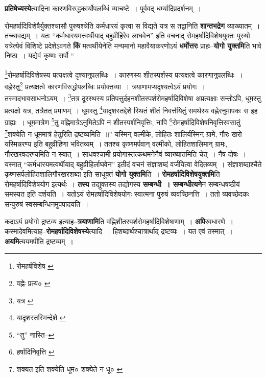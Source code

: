\documentclass[article,12pt,a4paper]{memoir}
\begin{document}
	  \pstart \textbf{प्रतिषेध्यस्ये}त्यादिना कारणविरुद्धकार्योपलब्धिं व्याचष्टे । पूर्ववद् धर्म्यादिप्रदर्शनम् ।
	\pend
      

	  \pstart रोमहर्षादिविशेषैर्युक्तश्चासौ पुरुषश्चेति कर्मधारयं कृत्वा स विद्यते यत्र स तद्वानिति \textbf{शान्तभद्रेण} व्याख्यातम् । तच्चावद्यम् । यतः “कर्मधारयमत्त्वर्थीयाद् बहुव्रीहिरेव लाघवेन” इति वचनाद् रोमहर्षादिविशेषयुक्तः पुरुषो यत्रेत्येवं विशिष्टे प्रदेशेऽवगते \textbf{किं} मत्वर्थीयेनेति मन्यमानो महावैयाकरणोऽयं \textbf{धर्मोत्तरः} प्राहः--\textbf{योगो युक्तमि}ति भावे निष्ठा । यद्येवं कृष्णः सर्पो  \leavevmode{} “
	  
	\footnote{रोमहर्षविशेष \cite{dp-msD} \cite{dp-msB}}\-रोमहर्षादिविशेषस्य प्रत्यक्षत्वे दृश्यानुपलब्धिः । कारणस्य शीतस्पर्शस्य प्रत्यक्षत्वे कारणानुपलब्धिः । वह्नेस्तु\footnote{वह्नेः प्रत्य० \cite{dp-msC} \cite{dp-msD}} प्रत्यक्षत्वे कारणविरुद्धोपलब्धिः प्रयोक्तव्या । त्रयाणामप्यदृश्यत्वेऽयं प्रयोगः । तस्मादभावसाधनोऽयम् । \footnote{यत्र \cite{dp-msA}}\-तत्र दूरस्थस्य प्रतिपत्तुर्दहनशीतस्पर्शरोमहर्षादिविशेषा अप्रत्यक्षाः सन्तोऽपि, धूमस्तु प्रत्यक्षो यत्र, तत्रैतत् प्रमाणम् । धूमस्तु \footnote{यादृशस्तस्मिन्देशे \cite{dp-msA} \cite{dp-msC} \cite{dp-edP} \cite{dp-edH} \cite{dp-edE} \cite{dp-edN}}\-यादृशस्तद्देशे स्थितं शीतं निवर्त्तयितुं समर्थस्य वह्नेरनुमापकः स इह ग्राह्यः । धूममात्रेण \footnote{“तु” नास्ति--\cite{dp-msA}}\-तु वह्निमात्रेऽनुमितेऽपि न शीतस्पर्शनिवृत्तिः, नापि \footnote{हर्षादिनिवृत्ति \cite{dp-msD} \cite{dp-msB}}\-रोमहर्षादिविशेषनिवृत्तिरवसातुं \footnote{शक्यत इति \cite{dp-msC} शक्येति धूम० \cite{dp-msA} शक्येते न धू० \cite{dp-edH}}\-शक्येति न धूममात्रं हेतुरिति द्रष्टव्यमिति ॥” यस्मिन् वल्मीके, लोहितः शालिर्यस्मिन् ग्रामे, गौरः खरो यस्मिन्नरण्य इति बहुव्रीहिणा भवितव्यम् । ततश्च कृष्णमर्पवान् वल्मीको, लोहितशालिमान् ग्रामः, गौरखरवदरण्यमिति न स्यात् । साधवश्चामी प्रयोगास्तत्कथमनेनैवं व्याख्यातमिति चेत् । नैष दोषः । यस्मात् “कर्मधारयमत्वर्थीयाद् बहुव्रीहिर्लाघवेन” इतीदं वचनं संज्ञाशब्दं वर्जयित्वा वेदितव्यम् । संज्ञाशब्दाश्चैते कृष्णसर्पलोहितशालिगौरखरशब्दा इति साधूक्तं \textbf{योगो युक्तमि}ति । \textbf{रोमहर्षादिविशेषयुक्तमि}ति रोमहर्षादिविशेषयोग इत्यर्थः । \textbf{तस्य} तद्युक्तस्य तद्योगस्य \textbf{सम्बन्धी । सम्बन्धीत्यने}न सम्बन्धषष्ठीयं समस्यत इति दर्शयति । यतोऽयं रोमहर्षादिविशेषयोगः स्वात्मना पुरुषं व्यवच्छिनत्ति । ततो व्यवच्छेदकः सन्पुरुषं स्वसम्बन्धिनमुपपादयति ।
	\pend
      

	  \pstart कदाऽयं प्रयोगो द्रष्टव्य इत्याह--\textbf{त्रयाणामि}ति वह्निशीतस्पर्शरोमहर्षादिविशेषाणाम् । \textbf{अपि}रवधारणे । कस्मादेवमित्याह--\textbf{रोमहर्षादिविशेषस्ये}त्यादि । हिशब्दार्थश्चात्रार्थाद् द्रष्टव्यः । यत एवं तस्मात् । \leavevmode{} \textbf{अयमि}त्ययमपीति द्रष्टव्यम् ।
	\pend
      
\end{document}
